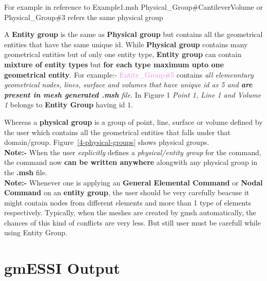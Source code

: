 \documentclass[11pt]{article}
\begin{document}
\begin{itemize}
\begin{itemize}
  \end{itemize}

  For          example          in          reference        to    {Example1.msh
  Physical\_Group\#CantileverVolume   or   Physical\_Group\#3   refers  the  same
  physical group}
 
  A  \textbf{Entity  group}  is the same as \textbf{Physical group} but
  contains  all  the  geometrical  entities  that  have  the same unique id. While
  \textbf{Physical  group}  contains  many  geometrical  entities  but of only one
  entity  type, \textbf{Entity group} can contain \textbf{mixture of entity types}
  but  \textbf{for  each  type maximum upto one geometrical entity}. For example:-
  \textcolor{violet}{Entity\_Group\#5}     contains     \textit{all    elemenntary
  geometrical  nodes,  lines,  surface  and  volumes  that have unique id as 5 and
  \textbf{are  present in mesh generated .msh} file}. In Figure 1 \textit{Point 1,
  Line 1 and Volume 1} belongs to \textbf{Entity Group} having id $1$.

  Whereas a \textbf{physical group} is a group of point, line, surface or
  volume defined by the user which contains all the geometrical entities that
  falls under that domain/group. Figure~\ref{4-physical-groups} shows physical groups.\\

  \textbf{Note:- } When the user \textit{explicitly} defines a
  \textit{physical/entity group} for the command, the command now \textbf{can
  be written anywhere} alongwith any physical group in the \textbf{.msh}
  file.\\

  \textbf{Note:- } Whenever one is applying an \textbf{General Elemental
  Command} or \textbf{Nodal Command} on an \textbf{entity group}, the user should be
  very carefully beacuse it might contain nodes from different elements and
  more than 1 type of elements respectively. Typically, when the meshes are
  created by gmsh automatically, the chances of this kind of conflicts are
  very less. But still user must be carefull while using Entity Group.

\end {itemize}

\section{gmESSI Output}
\end{document}
